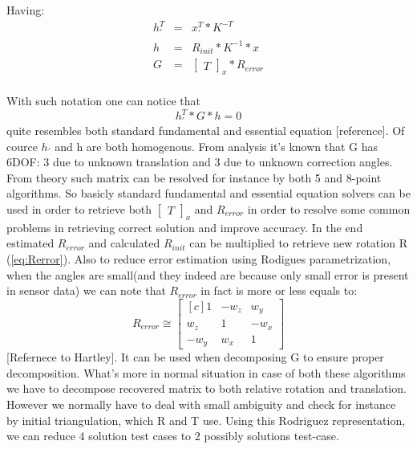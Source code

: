 Having:
\begin{equation} \label{eq:leftRelative}
\begin{array}{lcl}
h_{'}^{T} &=& {x}_{'}^{T} * K^{-T} \\
h &=& R_{init} * K^{-1} * x \\
G &=& \begin{bmatrix}T\end{bmatrix}_{x} * R_{error} \\
\end{array}
\end{equation}

With such notation one can notice that
\begin{equation} \label{eq:alternativeEnhancedEquation}
{h}_{'}^{T} * G * h = 0
\end{equation}
quite resembles both standard fundamental and essential equation [reference]. Of cource $h_{'}$ and h are both homogenous. From analysis it's known that G has 6DOF: 3 due to unknown translation and 3 due to unknown correction angles. From theory such matrix can be resolved for instance by both 5 and 8-point algorithms. So basicly standard fundamental and essential equation solvers can be used in order to retrieve both $\begin{bmatrix}T\end{bmatrix}_{x}$ and $R_{error}$ in order to resolve some common problems in retrieving correct solution and improve accuracy. 
In the end estimated $R_{error}$ and calculated $R_{init}$ can be multiplied to retrieve new rotation R (\ref{eq:Rerror}).
Also to reduce error estimation using Rodigues parametrization, when the angles are small(and they indeed are because only small error is present in sensor data) we can note that $R_{error}$ in fact is more or less equals to:
\begin{equation}
R_{error} \cong 
\begin{bmatrix*}[c]
 1& -w_{z}  &w_{y}\\ 
 w_{z} &1  & -w_{x}\\
  -w_{y}&  w_{x}&1
\end{bmatrix*}
\end{equation} 
[Refernece to Hartley]. It can be used when decomposing G to ensure proper decomposition. What's more in normal situation in case of both these algorithms we have to decompose recovered matrix to both relative rotation and translation. However we normally have to deal with small ambiguity and check for instance by initial triangulation, which R and T use. Using this Rodriguez representation, we can reduce 4 solution test cases to 2 possibly solutions test-case.
